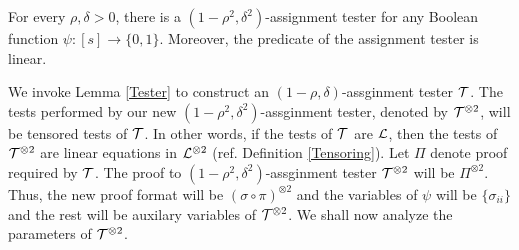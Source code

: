 \begin{lemma} \label{tensortester} For
  every $\rho, \delta > 0$, there is a $(1 - \rho^2,
  \delta^2)$-assignment tester for any Boolean function $\psi : [s]
  \rightarrow \{0,1\}$. Moreover, the predicate of the assignment
  tester is linear.
\end{lemma}
 We invoke Lemma \ref{Tester} to construct an
$(1 - \rho, \delta)$-assginment tester ${\cal T}$. The tests performed
by our new $(1 - \rho^2, \delta^2)$-assginment tester, denoted by
${\cal T}^{\otimes 2}$, will be tensored tests of ${\cal T}$. In other
words, if the tests of ${\cal T}$ are ${\cal L}$, then the tests of ${\cal
  T}^{\otimes 2}$ are linear equations in ${\cal L}^{\otimes 2}$
(ref. Definition \ref{Tensoring}). Let $\Pi$ denote proof required by
${\cal T}$. The proof to $(1 - \rho^2, \delta^2)$-assginment tester
${\cal T}^{\otimes 2}$ will be ${\Pi}^{\otimes 2}$. Thus, the new
proof format will be $(\sigma \circ \pi)^{\otimes 2}$ and the
variables of $\psi$ will be $\{ \sigma_{ii}\}$ and the rest will be
auxilary variables of ${\cal T}^{\otimes 2}$. We shall now analyze the
parameters of ${\cal T}^{\otimes 2}$.

